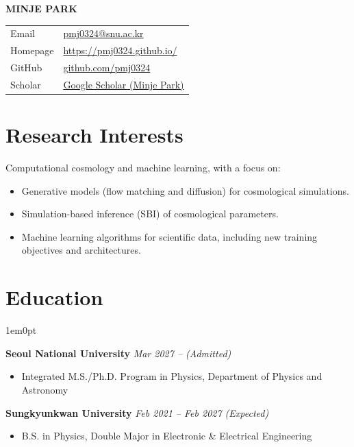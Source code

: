 \documentclass[11pt, a4paper]{article}
\newenvironment{tightbullets}{\vspace{-\parskip}\begin{itemize}[leftmargin=1.2em, itemsep=2.5pt, parsep=0pt, topsep=2pt, partopsep=0pt]}{\end{itemize}}
\newenvironment{secbody}{\begin{adjustwidth}{1em}{0pt}}{\end{adjustwidth}}
\begin{document}
\vspace{-6pt}

{\Huge\bfseries\color{primary} MINJE PARK}

\vspace{6pt}
\noindent
{\small
\renewcommand{\arraystretch}{1.1}
\begin{tabularx}{\textwidth}{@{}p{}X@{}}
Email &
\href{mailto:pmj0324@snu.ac.kr}{pmj0324@snu.ac.kr} \\
Homepage &
\href{https://pmj0324.github.io/}{https://pmj0324.github.io/} \\
GitHub &
\href{https://github.com/pmj0324}{github.com/pmj0324} \\
Scholar &
\href{https://scholar.google.com/citations?user=oC5mE0AAAAAJ}{Google Scholar (Minje Park)} \\
\end{tabularx}}

\vspace{2pt}

\section{Research Interests}
Computational cosmology and machine learning, with a focus on:
\begin{tightbullets}
    \item Generative models (flow matching and diffusion) for cosmological simulations.
    \item Simulation-based inference (SBI) of cosmological parameters.
    \item Machine learning algorithms for scientific data, including new training objectives and architectures.
\end{tightbullets}

\section{Education}
\begin{secbody}

\vspace{3.5pt}
\noindent
{\large\textbf{Seoul National University}} \hfill \textit{Mar 2027 -- (Admitted)}
\begin{tightbullets}
    \item Integrated M.S./Ph.D. Program in Physics, Department of Physics and Astronomy
\end{tightbullets}

\vspace{2pt}
\noindent
{\large\textbf{Sungkyunkwan University}} \hfill \textit{Feb 2021 -- Feb 2027 (Expected)}
\begin{tightbullets}
    \item B.S. in Physics, Double Major in Electronic \& Electrical Engineering
\end{tightbullets}
\end{secbody}
\end{document}
